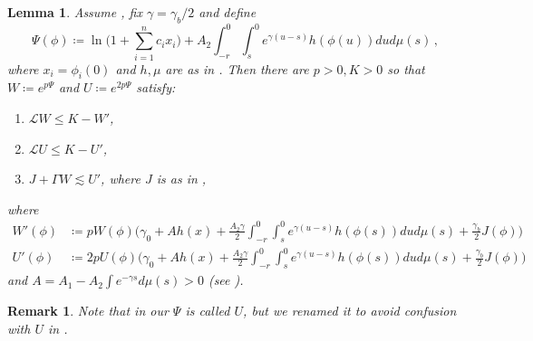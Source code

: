 \documentclass[final]{amsart}
\newtheorem{lem}[thm]{Lemma}
\newtheorem{rem}[thm]{Remark}
\numberwithin{thm}{section}
\numberwithin{equation}{section}
\newcommand{\Ll}{\mathcal{L}}
\begin{document}
\begin{lem}\label{func-WU}
    Assume , fix $\gamma = \gamma_b/2$ and define
    \begin{equation}\label{Psi-functional}
        \Psi(\phi) \coloneqq \ln\Big({1 + \sum_{i=1}^n c_ix_i}\Big) + A_2\int_{-r}^0\int_s^0 e^{\gamma (u-s)} h(\phi(u))dud\mu(s) \,,
    \end{equation}
    where $x_i = \phi_i(0)$ and $h, \mu$ are as in . 
Then there are $p > 0, K > 0$ so that $W \coloneqq e^{p\Psi}$ and $U \coloneqq e^{2p\Psi}$ satisfy: \begin{enumerate}[label=(\roman*)]
        \item \label{func-lw} $\Ll W \leq K - W'$,
        \item \label{func-lu} $\Ll U \leq K - U'$,
        \item \label{func-gamma} $J + \Gamma W \lesssim U'$, where $J$ is as in ,
    \end{enumerate}
    where
\begin{equation}
    \begin{aligned}
        W'(\phi) &\coloneqq pW(\phi)\Big(\gamma_0 + Ah(x) + \frac{A_2\gamma}{2}\int_{-r}^0\int_s^0 e^{\gamma (u-s)} h(\phi(s))dud\mu(s) + \frac{\gamma_b}{2}J(\phi)\Big) \\
        U'(\phi) &\coloneqq 2pU(\phi)\Big(\gamma_0 + Ah(x) + \frac{A_2\gamma}{2}\int_{-r}^0\int_s^0 e^{\gamma (u-s)} h(\phi(s))dud\mu(s) + \frac{\gamma_b}{2}J(\phi)\Big)
    \end{aligned}
\end{equation}
and $A = A_1 - A_2 \int e^{-\gamma s}d\mu(s) > 0$ (see ).
\end{lem}

\begin{rem}
    Note that in \cite[Lemma 3.1]{functional}  our $\Psi$ is called $U$, but we renamed it to avoid confusion with $U$ in .
\end{rem}
\end{document}
